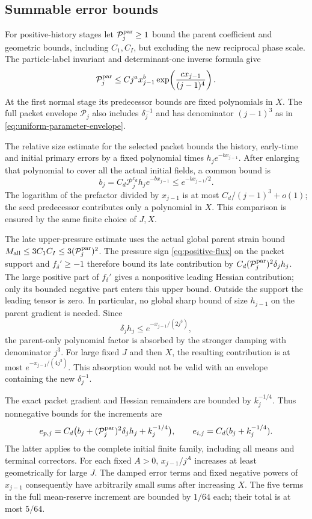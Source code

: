 \documentclass[11pt]{article}
\theoremstyle{definition}
\begin{document}
\subsection{Summable error bounds}
For positive-history stages let $\mathcal P_j^{\rm par}\geq1$
bound the parent coefficient and geometric bounds, including $C_1,C_I$,
but excluding the new reciprocal phase scale. The particle-label
invariant and determinant-one inverse formula give
\[
 \mathcal P_j^{\rm par}
 \leq Cj^a x_{j-1}^b\exp\!\left(\frac{c x_{j-1}}{(j-1)^4}\right).
\]
At the first normal stage its predecessor bounds are fixed polynomials
in $X$. The full packet envelope $\mathcal P_j$ also includes
$\delta_j^{-1}$ and has denominator $(j-1)^3$ as in
\eqref{eq:uniform-parameter-envelope}.

The relative size estimate for the selected packet bounds the history,
early-time and initial primary errors by a fixed polynomial times
$h_j e^{-b x_{j-1}}$. After enlarging that polynomial to cover all the
actual initial fields, a common bound is
\[
 b_j=C_d\mathcal P_j^{c_d}h_j e^{-b x_{j-1}}
                         \leq e^{-b x_{j-1}/2}.
\]
The logarithm of the prefactor divided by $x_{j-1}$ is at most
$C_d/(j-1)^3+o(1)$; the seed predecessor contributes only a polynomial
in $X$. This comparison is ensured by the same finite choice of $J,X$.

The late upper-pressure estimate uses the actual global parent strain
bound $M_{\rm all}\leq3C_1C_I\leq3(\mathcal P_j^{\rm par})^2$.
The pressure sign \eqref{eq:positive-flux} on the packet support and
$f_\delta'\geq-1$ therefore bound its late contribution by
$C_d(\mathcal P_j^{\rm par})^2\delta_jh_j$.
The large positive part of $f_\delta'$ gives a nonpositive leading
Hessian contribution; only its bounded negative part enters this upper
bound. Outside the support the leading tensor is zero. In particular,
no global sharp bound of size $h_{j-1}$ on the parent gradient is needed.
Since
\[
 \delta_jh_j\leq e^{-x_{j-1}/(2j^3)},
\]
the parent-only polynomial factor is absorbed by the stronger damping
with denominator $j^3$. For large fixed $J$ and then $X$, the resulting
contribution is at most $e^{-x_{j-1}/(4j^3)}$. This absorption would not be
valid with an envelope containing the new $\delta_j^{-1}$.

The exact packet gradient and Hessian remainders are bounded by
$k_j^{-1/4}$. Thus nonnegative bounds for the increments are
\begin{equation}\label{eq:actual-increment-budgets}
 e_{p,j}=C_d\bigl(b_j+(\mathcal P_j^{\rm par})^2\delta_jh_j
                         +k_j^{-1/4}\bigr),\qquad
 e_{i,j}=C_d(b_j+k_j^{-1/4}).
\end{equation}
The latter applies to the complete initial finite family, including all
means and terminal correctors. For each fixed $A>0$,
$x_{j-1}/j^A$ increases at least geometrically for large $J$.
The damped error terms and fixed negative powers of $x_{j-1}$ consequently
have arbitrarily small sums after increasing $X$. The five terms in
the full mean-reserve increment are bounded by $1/64$ each;
their total is at most $5/64$.
\end{document}
